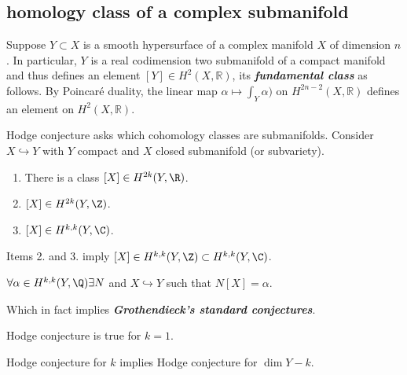 \subsection{homology class of a complex submanifold}

\begin{remark}[2.3.11, Huybrechts]
	Suppose $Y\subset X$ is a smooth hypersurface of a complex manifold $X$ of dimension $n$. In particular, $Y$ is a real codimension two submanifold of a compact manifold and thus defines an element $[Y]\in H^{2}(X,\mathbb{R})$, its \textit{\textbf{fundamental class}} as follows. By Poincar\'e duality, the linear map $\alpha\mapsto \int_{Y}\alpha)$ on $H^{2n-2}(X,\mathbb{R})$ defines an element on $H^{2}(X,\mathbb{R})$.
\end{remark}

Hodge conjecture asks which cohomology classes are submanifolds. Consider $X\hookrightarrow Y$ with $Y$ compact and $X$ closed submanifold (or subvariety).

\begin{enumerate}
	\item There is a class $[X]\in H^{2k}(Y,\R)$.
	\item $[X]\in H^{2k}(Y,\Z)$.
	\item $[X]\in H^{k,k}(Y,\C)$.
\end{enumerate}
Items 2. and 3. imply $[X]\in H^{k,k}(Y,\Z)\subset H^{k,k}(Y,\C)$.
\begin{conjecture}[Hodge]
	
	$\forall\alpha\in H^{k,k}(Y,\Q)\exists N$ and $X\hookrightarrow Y$ such that $N[X]=\alpha$.
\end{conjecture}
Which in fact implies \textbf{\textit{Grothendieck's standard conjectures}}.
\begin{thm}
	Hodge conjecture is true for $k=1$.
\end{thm}
\begin{thm}
	Hodge conjecture for $k$ implies Hodge conjecture for $\dim Y-k$.
\end{thm}
